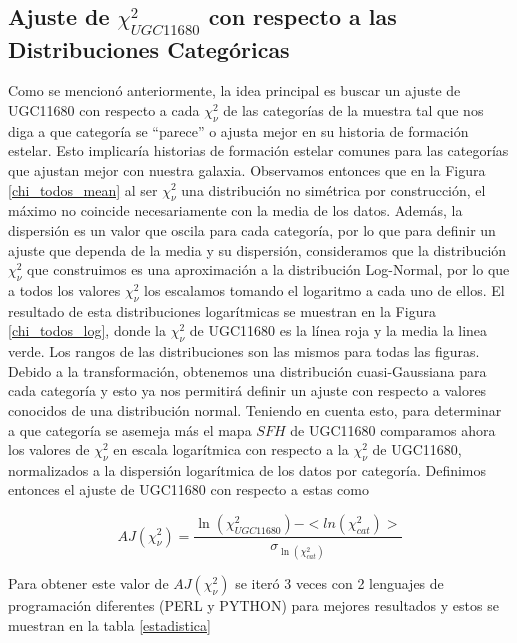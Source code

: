 \subsection{Ajuste de $\chi^2_{UGC11680}$ con respecto a las Distribuciones Categóricas}


\noindent Como se mencionó anteriormente, la idea principal es buscar un ajuste de UGC11680 con respecto a cada $\chi^2_{\nu}$ de las categorías de la muestra tal que nos diga a que categoría se ``parece'' o ajusta mejor en su historia de formación estelar. Esto implicaría historias de formación estelar comunes  para las categorías que ajustan mejor con nuestra galaxia.  Observamos entonces que en la Figura \ref{chi_todos_mean} al ser $\chi^2_{\nu}$ una distribución no simétrica por construcción, el máximo no coincide necesariamente con la media de los datos. Además, la dispersión es un valor que oscila para cada categoría, por lo que para definir un ajuste que dependa de la media y su dispersión, consideramos que la distribución $\chi^2_{\nu}$ que construimos es una aproximación a la distribución Log-Normal, por lo que a todos los valores $\chi^{2}_{\nu}$  los escalamos tomando el logaritmo a cada uno de ellos. El resultado de esta distribuciones logarítmicas se muestran en la Figura \ref{chi_todos_log}, donde la $\chi^{2}_{\nu}$ de UGC11680  es la línea roja y la media la linea verde. Los rangos de las distribuciones son las mismos para todas las figuras. Debido a la transformación, obtenemos una distribución cuasi-Gaussiana para cada categoría y esto ya nos permitirá definir un ajuste con respecto a valores conocidos de una distribución normal. Teniendo en cuenta esto, para determinar a que categoría se asemeja más el mapa $SFH$ de UGC11680 comparamos ahora los valores de $\chi^{2}_{\nu}$ en escala logarítmica con respecto a la $\chi^2_{\nu}$ de UGC11680, normalizados a la dispersión logarítmica de los datos por categoría. Definimos entonces el ajuste de UGC11680 con respecto a estas como


\begin{equation}
AJ(\chi^2_{\nu})= \frac{ \ln(\chi^2_{UGC11680})  -  < ln (\chi^2_{cat})>} {\sigma_{\ln(\chi^2_{cat})}}
\end{equation}



\bigskip

\noindent Para obtener este valor de $AJ(\chi^2_{\nu})$ se iteró 3 veces con 2 lenguajes de programación diferentes (PERL y PYTHON)  para mejores resultados y estos se muestran en la tabla \ref{estadistica}

